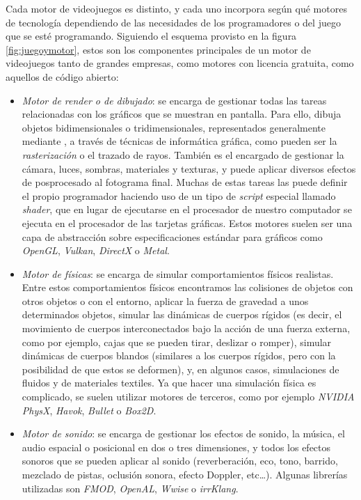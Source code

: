 Cada motor de videojuegos es distinto, y cada uno incorpora según qué motores de tecnología dependiendo de las necesidades de los programadores o del juego que se esté programando. Siguiendo el esquema provisto en la figura \ref{fig:juegoymotor}, estos son los componentes principales de un motor de videojuegos tanto de grandes empresas, como motores con licencia gratuita, como aquellos de código abierto:
\begin{itemize}
\item \textit{Motor de render o de dibujado}: se encarga de gestionar todas las tareas relacionadas con los gráficos que se muestran en pantalla. Para ello, dibuja objetos bidimensionales o tridimensionales, representados generalmente mediante , a través de técnicas de informática gráfica, como pueden ser la \textit{rasterización} o el trazado de rayos. También es el encargado de gestionar la cámara, luces, sombras, materiales y texturas, y puede aplicar diversos efectos de posprocesado al fotograma final. Muchas de estas tareas las puede definir el propio programador haciendo uso de un tipo de \textit{script} especial llamado \textit{shader}, que en lugar de ejecutarse en el procesador de nuestro computador se ejecuta en el procesador de las tarjetas gráficas. Estos motores suelen ser una capa de abstracción sobre especificaciones estándar para gráficos como \textit{OpenGL}, \textit{Vulkan}, \textit{DirectX} o \textit{Metal}.
\item \textit{Motor de físicas}: se encarga de simular comportamientos físicos realistas. Entre estos comportamientos físicos encontramos las colisiones de objetos con otros objetos o con el entorno, aplicar la fuerza de gravedad a unos determinados objetos, simular las dinámicas de cuerpos rígidos (es decir, el movimiento de cuerpos interconectados bajo la acción de una fuerza externa, como por ejemplo, cajas que se pueden tirar, deslizar o romper), simular dinámicas de cuerpos blandos (similares a los cuerpos rígidos, pero con la posibilidad de que estos se deformen), y, en algunos casos, simulaciones de fluidos y de materiales textiles. Ya que hacer una simulación física es complicado, se suelen utilizar motores de terceros, como por ejemplo \textit{NVIDIA PhysX}, \textit{Havok}, \textit{Bullet} o \textit{Box2D}.
\item \textit{Motor de sonido}: se encarga de gestionar los efectos de sonido, la música, el audio espacial o posicional en dos o tres dimensiones, y todos los efectos sonoros que se pueden aplicar al sonido (reverberación, eco, tono, barrido, mezclado de pistas, oclusión sonora, efecto Doppler, etc\ldots). Algunas librerías utilizadas son \textit{FMOD}, \textit{OpenAL}, \textit{Wwise} o \textit{irrKlang}.

\end{itemize}
